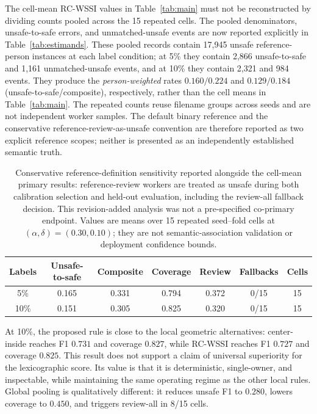 \documentclass[iicol,pdflatex,sn-mathphys-num]{sn-jnl}
\begin{document}
The cell-mean RC-WSSI values in Table~\ref{tab:main} must not be reconstructed by dividing counts pooled across the 15 repeated cells. The pooled denominators, unsafe-to-safe errors, and unmatched-unsafe events are now reported explicitly in Table~\ref{tab:estimands}. These pooled records contain 17,945 unsafe reference-person instances at each label condition; at 5\% they contain 2,866 unsafe-to-safe and 1,161 unmatched-unsafe events, and at 10\% they contain 2,321 and 984 events. They produce the \emph{person-weighted} rates $0.160/0.224$ and $0.129/0.184$ (unsafe-to-safe/composite), respectively, rather than the cell means in Table~\ref{tab:main}. The repeated counts reuse filename groups across seeds and are not independent worker samples. The default binary reference and the conservative reference-review-as-unsafe convention are therefore reported as two explicit reference scopes; neither is presented as an independently established semantic truth.

\begin{table}[t]
\caption{Conservative reference-definition sensitivity reported alongside the cell-mean primary results: reference-review workers are treated as unsafe during both calibration selection and held-out evaluation, including the review-all fallback decision. This revision-added analysis was not a pre-specified co-primary endpoint. Values are means over 15 repeated seed--fold cells at $(\alpha,\delta)=(0.30,0.10)$; they are not semantic-association validation or deployment confidence bounds.}
\label{tab:reviewunsafe}
\centering
\scriptsize
\setlength{\tabcolsep}{5pt}
\begin{tabular}{@{}c c c c c c c@{}}
\toprule
Labels & Unsafe-to-safe & Composite & Coverage & Review & Fallbacks & Cells \\
\midrule
5\%  & 0.165 & 0.331 & 0.794 & 0.372 & 0/15 & 15 \\
10\% & 0.151 & 0.305 & 0.825 & 0.320 & 0/15 & 15 \\
\bottomrule
\end{tabular}
\end{table}

At 10\%, the proposed rule is close to the local geometric alternatives: center-inside reaches F1 $0.731$ and coverage $0.827$, while RC-WSSI reaches F1 $0.727$ and coverage $0.825$. This result does not support a claim of universal superiority for the lexicographic score. Its value is that it is deterministic, single-owner, and inspectable, while maintaining the same operating regime as the other local rules. Global pooling is qualitatively different: it reduces unsafe F1 to $0.280$, lowers coverage to $0.450$, and triggers review-all in 8/15 cells.
\end{document}
